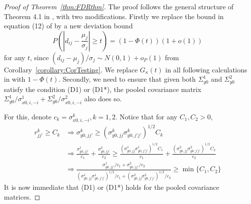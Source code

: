 \begin{proof}[Proof of Theorem~\ref{thm:FDRthm}]
The proof follows the general structure of Theorem 4.1 in \cite{LiuShao14}, with two modifications. Firstly we replace the bound in equation (12) of \cite{LiuShao14} by a new deviation bound
%
$$
P \left( \left| d_{ij} - \frac{\mu_j}{\sigma_j} \right| \geq t \right) = (1 - \Phi(t))(1 + o(1))
$$
%
for any $t$, since $(d_{ij} - \mu_j)/\sigma_j \sim N(0,1) + o_P(1)$ from Corollary~\ref{corollary:CorTesting}. We replace $G_\kappa(t)$ in all following calculations in \cite{LiuShao14} with $1 - \Phi(t)$. Secondly, we need to ensure that given both $\Sigma_{y0}^1$ and $\Sigma_{y0}^2$ satisfy the condition (D1) or (D1*), the pooled covariance matrix $\Sigma_{y0}^1/ \sigma_{x0,i,-i}^1 + \Sigma_{y0}^2/  \sigma_{x0,i,-i}^2$ also does so.

For this, denote $c_k =  \sigma_{x0,i,-i}^k, k = 1,2$. Notice that for any $C_1, C_2 > 0$,
%
\begin{align*}
r_{jj'}^k \geq C_k & \Rightarrow \sigma_{y0,jj'}^k \geq (\sigma_{y0,jj}^k \sigma_{y0,j'j'}^k)^{1/2} C_k\\
& \Rightarrow \frac{\sigma_{y0,jj'}^1}{c_1} + \frac{\sigma_{y0,jj'}^2}{c_2} \geq
\frac{ (\sigma_{y0,jj}^1 \sigma_{y0,j'j'}^1)^{1/2} C_1}{c_1} +
\frac{ (\sigma_{y0,jj}^2 \sigma_{y0,j'j'}^2)^{1/2} C_2}{c_2}\\
& \Rightarrow \frac{ \sigma_{y0,jj'}^1/c_1 + \sigma_{y0,jj'}^2/c_2}
{ (\sigma_{y0,jj}^1 \sigma_{y0,j'j'}^1)^{1/2}/ c_1 + (\sigma_{y0,jj}^2 \sigma_{y0,j'j'}^2)^{1/2}/ c_2}
\geq \min \{ C_1, C_2 \}
\end{align*}
%
It is now immediate that (D1) or (D1*) holds for the pooled covariance matrices.
\end{proof}



